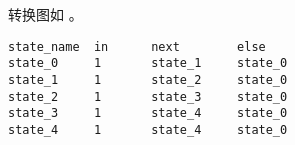 \documentclass[lang=cn,11pt,a4paper,cite=authoryear]{elegantpaper}
\begin{document}


转换图如  。

\begin{lstlisting}
state_name  in      next        else
state_0     1       state_1     state_0
state_1     1       state_2     state_0
state_2     1       state_3     state_0
state_3     1       state_4     state_0 
state_4     1       state_4     state_0
\end{lstlisting}




\end{document}
